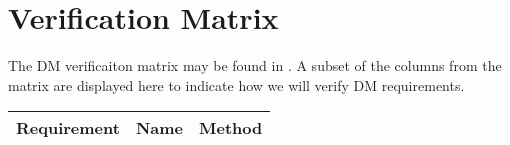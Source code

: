 \section{Verification Matrix} \label{sect:vvm}

The DM verificaiton matrix may be found in . A subset of the columns from the matrix are displayed
here to indicate how we will verify DM requirements.

\small

\begin{longtable}{|l|p{}|l|}
\hline
\textbf{Requirement} & \textbf{Name} &\textbf{Method} \\\hline

\end{longtable}

\normalsize
